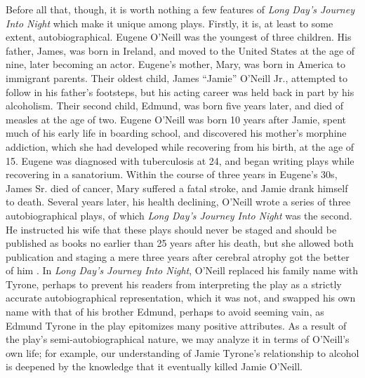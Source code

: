 \documentclass[letterpaper, 12pt]{article}
\newcommand{\ldjin}{\textit{Long Day's Journey Into Night}}
\newcommand{\oneill}{O'Neill}
\begin{document}
Before all that, though, it is worth nothing a few features of \ldjin{} which
make it unique among plays. Firstly, it is, at least to some extent,
autobiographical. Eugene \oneill{} was the youngest of three children. His
father, James, was born in Ireland, and moved to the United States at the age
of nine, later becoming an actor. Eugene's mother, Mary, was born in America to
immigrant parents. Their oldest child, James \enquote{Jamie} \oneill{} Jr.,
attempted to follow in his father's footsteps, but his acting career was held
back in part by his alcoholism. Their second child, Edmund, was born five years
later, and died of measles at the age of two. Eugene \oneill{} was born 10
years after Jamie, spent much of his early life in boarding school, and
discovered his mother's morphine addiction, which she had developed while
recovering from his birth, at the age of 15. Eugene was diagnosed with
tuberculosis at 24, and began writing plays while recovering in a
sanatorium. Within the course of three years in Eugene's 30s, James Sr. died of
cancer, Mary suffered a fatal stroke, and Jamie drank himself to death. Several
years later, his health declining, \oneill{} wrote a series of three
autobiographical plays, of which \ldjin{} was the second. He instructed his
wife that these plays should never be staged and should be published as books
no earlier than 25 years after his death, but she allowed both publication and
staging a mere three years after cerebral atrophy got the better of him
\parencite[loc. 2826--2862]{timeline}. In \ldjin{}, \oneill{} replaced his
family name with Tyrone, perhaps to prevent his readers from interpreting the
play as a strictly accurate autobiographical representation, which it was not,
and swapped his own name with that of his brother Edmund, perhaps to avoid
seeming vain, as Edmund Tyrone in the play epitomizes many positive
attributes. As a result of the play's semi-autobiographical nature, we may
analyze it in terms of \oneill{}'s own life; for example, our understanding of
Jamie Tyrone's relationship to alcohol is deepened by the knowledge that it
eventually killed Jamie \oneill{}.
\end{document}
